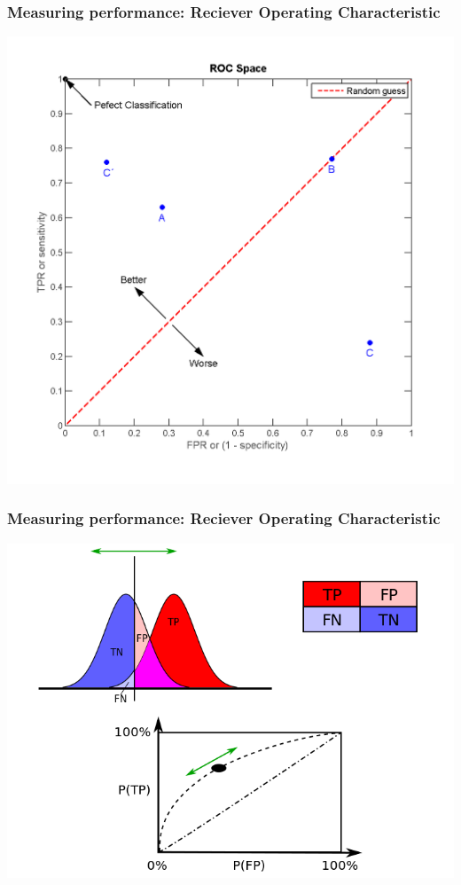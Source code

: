 \documentclass{beamer}
\begin{document}
\begin{frame}
  \frametitle{Measuring performance: Reciever Operating Characteristic}

  \begin{center}
    \includegraphics[width=\textwidth,height=0.8\textheight,keepaspectratio=true]{figure/wiki_ROC_space-2}
  \end{center}
  

\end{frame}


\begin{frame}
  \frametitle{Measuring performance: Reciever Operating Characteristic}
  
  \begin{center}
    \includegraphics[width=\textwidth,height=0.8\textheight,keepaspectratio=true]{figure/wiki_709px-ROC_curves}
  \end{center}
  
  
\end{frame}
\end{document}
